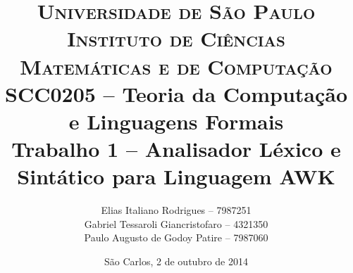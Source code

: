 \begin{titlepage}

		\title{
\textsc {\large Universidade de São Paulo\\
Instituto de Ciências Matemáticas e de Computação}\\[1cm]
{\large SCC0205 -- Teoria da Computação e Linguagens Formais}\\[5cm]
{\LARGE Trabalho 1 -- Analisador Léxico e Sintático para Linguagem AWK\\[4cm]}
		}

		\author{
Elias Italiano Rodrigues -- 7987251\\
Gabriel Tessaroli Giancristofaro -- 4321350\\
Paulo Augusto de Godoy Patire -- 7987060
		}

		\date{
\vfill São Carlos, 2 de outubro de 2014
		}

		\maketitle
		\thispagestyle{empty}

\end{titlepage}

